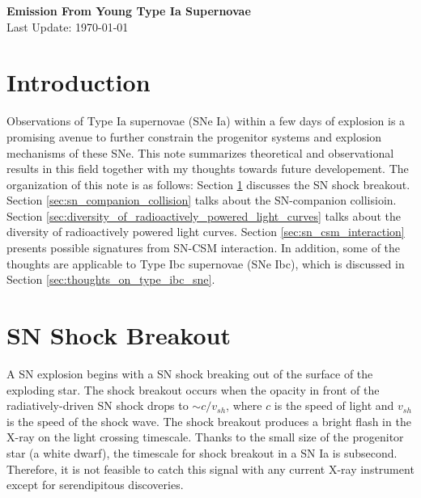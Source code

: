 \documentclass[11pt]{article}
\begin{document}

\begin{center}
  \textbf{\Large Emission From Young Type Ia Supernovae}\\
  Last Update: \today
\end{center}

\section{Introduction}
\label{sec:introduction}

Observations of Type Ia supernovae (SNe Ia) within a few days of
explosion is a promising avenue to further constrain the progenitor
systems and explosion mechanisms of these SNe. This note summarizes
theoretical and observational results in this field together with my
thoughts towards future developement. The organization of this note is
as follows: Section \ref{sec:introduction} discusses the SN shock
breakout. Section \ref{sec:sn_companion_collision} talks about the
SN-companion collisioin. Section
\ref{sec:diversity_of_radioactively_powered_light_curves} talks about
the diversity of radioactively powered light curves. Section
\ref{sec:sn_csm_interaction} presents possible signatures from SN-CSM
interaction. In addition, some of the thoughts are applicable to Type
Ibc supernovae (SNe Ibc), which is discussed in Section
\ref{sec:thoughts_on_type_ibc_sne}.

\section{SN Shock Breakout}
\label{sec:sn_shock_breakout}

A SN explosion begins with a SN shock breaking out of the surface of
the exploding star. The shock breakout occurs when the opacity in
front of the radiatively-driven SN shock drops to $\sim c/v_{sh}$,
where $c$ is the speed of light and $v_{sh}$ is the speed of the shock
wave.  The shock breakout produces a bright flash in the X-ray on the
light crossing timescale. Thanks to the small size of the progenitor
star (a white dwarf), the timescale for shock breakout in a SN Ia is
subsecond. Therefore, it is not feasible to catch this signal with any
current X-ray instrument except for serendipitous discoveries.
\end{document}
